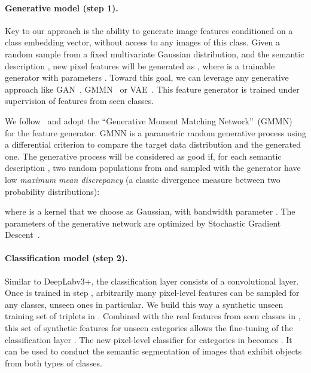 \documentclass{article}
\begin{document}
\vspace{-0.3cm}
\paragraph{Generative model (step 1).}
Key to our approach is the ability to generate image features conditioned on a class embedding vector, without access to any images of this class.
Given a random sample  from a fixed multivariate Gaussian distribution, and the semantic description , new pixel features will be generated as , where  is a trainable generator with parameters .
Toward this goal, we can leverage any generative approach like GAN~\cite{goodfellow2014generative}, GMMN~\cite{li2015generative} or VAE~\cite{kingma2013auto}. This feature generator is trained under supervision of features from seen classes.


We follow~\cite{bucher2017generating} and adopt the ``Generative Moment Matching Network''~(GMMN)~\cite{li2015generative} for the feature generator.
GMNN is a parametric random generative process  using a differential criterion to compare the target data distribution and the generated one.
The generative process will be considered as good if, for each semantic description , two random populations  from  and  sampled with the generator have low \emph{maximum mean discrepancy} (a classic divergence measure between two probability distributions):


where  is a kernel that we choose as Gaussian,  with bandwidth parameter .
The parameters  of the generative network are optimized by Stochastic Gradient Descent~\cite{bottou2010large}.


\vspace{-0.3cm}
\paragraph{Classification model (step 2).}
Similar to DeepLabv3+, the classification layer  consists of a  convolutional layer.
Once  is trained in step , arbitrarily many pixel-level features can be sampled for any classes, unseen ones in particular.
We build this way a synthetic unseen training set  of triplets in .
Combined with the real features from seen classes in , this set of synthetic features for unseen categories allows the fine-tuning of the classification layer .
The new pixel-level classifier for categories in  becomes . 
It can be used to conduct the semantic segmentation of images that exhibit objects from both types of classes. 
\end{document}
